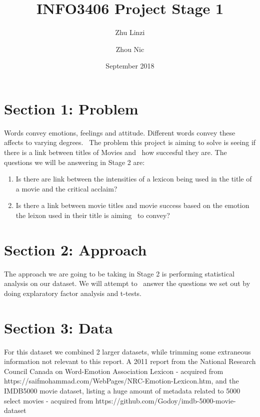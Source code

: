 \documentclass[12pt,a4paper]{article}
\begin{document}
\begin{titlepage}
    \title{INFO3406 Project Stage 1}
    \author{Zhu Linzi\\
            \and
            Zhou Nic
    }
    \date{September 2018}
    \maketitle
\end{titlepage}

    \pagebreak
    \tableofcontents
    \pagebreak

    \section{Section 1: Problem}
    Words convey emotions, feelings and attitude. Different words convey these affects to varying degrees. \
    The problem this project is aiming to solve is seeing if there is a link between titles of Movies and \
    how succesful they are.
    \newline \newline
    The questions we will be answering in Stage 2 are:

    \begin{enumerate}
        \item Is there are link between the intensities of a lexicon being used in the title of a movie and the critical acclaim?
        \item Is there a link between movie titles and movie success based on the emotion the leixon used in their title is aiming \
        to convey?

    \end{enumerate}

    \section{Section 2: Approach}
    The approach we are going to be taking in Stage 2 is performing statistical analysis on our dataset. We will attempt to \
    answer the questions we set out by doing explaratory factor analysis and t-tests.

    \section{Section 3: Data}
    
    For this dataset we combined 2 larger datasets, while trimming some extraneous information not relevant to this report. A 2011 report from the National Research Council Canada on Word-Emotion Association Lexicon - acquired from https://saifmohammad.com/WebPages/NRC-Emotion-Lexicon.htm, and the IMDB5000 movie dataset, listing a huge amount of metadata related to 5000 select movies - acquired from https://github.com/Godoy/imdb-5000-movie-dataset
\end{document}
